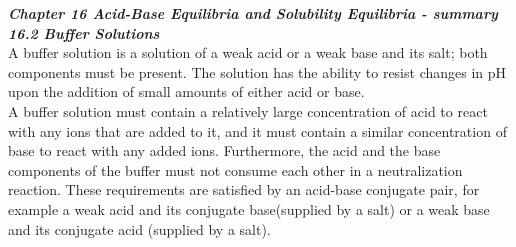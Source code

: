 \documentclass[./chem_exercises.tex]{subfiles}
\begin{document}
\begin{multicols}{2}
\textit{\textbf{Chapter 16 Acid-Base Equilibria and Solubility Equilibria - summary} }\\

\textit{\textbf{ 16.2 Buffer Solutions} }\\
A buffer solution is a solution of a weak acid or a weak base and its salt; both
components must be present. The solution has the ability to resist changes in pH 
upon the addition of small amounts of either acid or base.\\

A buffer solution must contain a relatively large concentration of acid to react with any
 ions that are added to it, and it must contain a similar concentration
of base to react with any added  ions. Furthermore, the acid and the base components of 
the buffer must not consume each other in a neutralization reaction.
These requirements are satisfied by an acid-base conjugate pair, for example
a weak acid and its conjugate base(supplied by a salt) or a weak base
and its conjugate acid (supplied by a salt).


\end{multicols}









\end{document}
